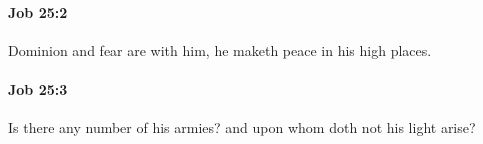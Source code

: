 		\paragraph{Job 25:2} %
			\label{JOB-25-2}

			Dominion and fear are with him, he maketh peace in his high places.


		\paragraph{Job 25:3} %
			\label{JOB-25-3}

			Is there any number of his armies? and upon whom doth not his light arise?


